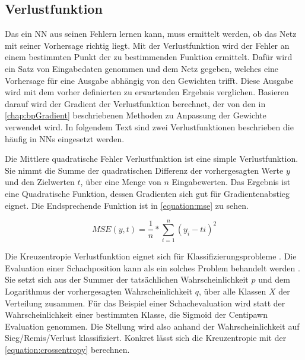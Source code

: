 


\subsection{Verlustfunktion}

Das ein \ac{NN} aus seinen Fehlern lernen kann, muss ermittelt werden, ob das Netz mit seiner Vorhersage richtig liegt. Mit der Verlustfunktion wird der Fehler an einem bestimmten Punkt der zu bestimmenden Funktion ermittelt. Dafür wird ein Satz von Eingabedaten genommen und dem Netz gegeben, welches eine Vorhersage für eine Ausgabe abhängig von den Gewichten trifft. Diese Ausgabe wird mit dem vorher definierten zu erwartenden Ergebnis verglichen. Basieren darauf wird der Gradient der Verlustfunktion berechnet, der von den in \autoref{chap:bpGradient} beschriebenen Methoden zu Anpassung der Gewichte verwendet wird. In folgendem Text sind zwei Verlustfunktionen beschrieben die häufig in \acp{NN} eingesetzt werden.

Die Mittlere quadratische Fehler Verlustfunktion ist eine simple Verlustfunktion. Sie nimmt die Summe der quadratischen Differenz der vorhergesagten Werte $y$ und den Zielwerten $t$, über eine Menge von $n$ Eingabewerten. Das Ergebnis ist eine Quadratische Funktion, dessen Gradienten sich gut für Gradientenabstieg eignet. Die Endsprechende Funktion ist in \autoref{equation:mse} zu sehen.

\begin{equation}
  MSE(y, t)=\frac{1}{n}*\sum^{n}_{i=1}(y_{i}-t{i})^{2}
  \label{equation:mse}
\end{equation}

Die Kreuzentropie Verlustfunktion eignet sich für Klassifizierungsprobleme \cite{Kline2005}. Die Evaluation einer Schachposition kann als ein solches Problem behandelt werden \cite{StockfishNNUE}. Sie setzt sich aus der Summer der tatsächlichen Wahrscheinlichkeit $p$ und dem Logarithmus der vorhergesagten Wahrscheinlichkeit $q$, über alle Klassen $X$ der Verteilung zusammen. Für das Beispiel einer Schachevaluation wird statt der Wahrscheinlichkeit einer bestimmten Klasse, die Sigmoid der Centipawn Evaluation genommen. Die Stellung wird also anhand der Wahrscheinlichkeit auf Sieg/Remis/Verlust klassifiziert. Konkret lässt sich die Kreuzentropie mit der \autoref{equation:crossentropy} berechnen.

